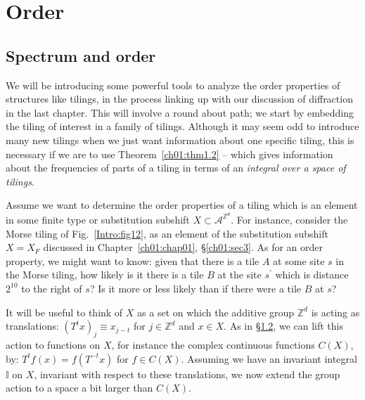 \documentclass[reqno]{stml-l}
\theoremstyle{plain}
\theoremstyle{definition}
\numberwithin{equation}{chapter}
\begin{document}
\chapter{Order}\label{ch03:chap03}

\section{Spectrum and order}\label{ch03:sec1}

We will be introducing some powerful tools to analyze the order properties of structures like tilings, in the process linking up with our discussion of diffraction in the last chapter. This will involve a round about path; we start by embedding the tiling of interest in a family of tilings. Although it may seem odd to introduce many new tilings when we just want information about one specific tiling, this is necessary if we are to use Theorem~\ref{ch01:thm1.2} -- which gives information about the frequencies of parts of a tiling in terms of an \emph{integral over a space of tilings}.

Assume we want to determine the order properties of a
tiling which is an element in some finite type or
substitution subshift $X\subset
\mathcal{A}^{\mathbb{Z}^{d}}$. For instance, consider the
Morse tiling of Fig.~\ref{Intro:fig12}, as an element of
the substitution subshift $X=X_{F}$ discussed in
Chapter~\ref{ch01:chap01}, \S \ref{ch01:sec3}. As for an order property,
we might want to know: given that there is a tile $A$ at
some site $s$ in the Morse tiling, how likely is it there
is a tile $B$ at the site $s^{\prime}$ which is distance
$2^{10}$ to the right of $s$? Is it more or less likely
than if there were a tile $B$ at $s$?

It will be useful to think of $X$ as a set on which the additive group $\mathbb{Z}^{d}$ is acting as translations: $(T^{t}x)_{j}\equiv x_{j-t}$ for $j\in \mathbb{Z}^{d}$ and $x\in X$. As in \S \hyperref[ch01:sec2]{1.2}, we can lift this action to functions on $X$, for instance the complex continuous functions $C(X)$, by: $T^{t}f(x)=f(T^{-t}x)$ for $f\in C(X)$. Assuming we have an invariant integral $\mathbb{I}$ on $X$, invariant with respect to these translations, we now extend the group action to a space a bit larger than $C(X)$.
\end{document}

